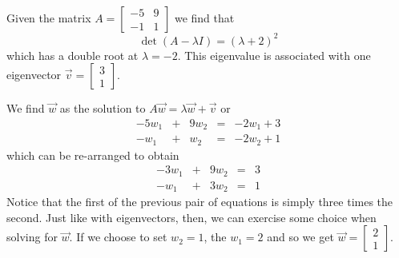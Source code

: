 \documentclass[../book.tex]{subfiles}
\begin{document}
\begin{solution}
Given the matrix \(A = \begin{bmatrix} -5 & 9 \\ -1 & 1\end{bmatrix}\) we find that
\begin{equation}\label{eq:sys-38}
\det (A - \lambda I) = (\lambda + 2)^2
\end{equation}
which has a double root at \(\lambda = -2\). This eigenvalue is associated with one eigenvector \(\vec{v} = \begin{bmatrix} 3 \\ 1 \end{bmatrix}\).

We find \(\vec{w}\) as the solution to \(A \vec{w} = \lambda  \vec{w} + \vec{v}\) or
\begin{equation}\label{eq:sys-39}
\begin{array}{rcrcl}
  - 5  w_1 &+& 9  w_2 &=& -2  w_1 + 3 \\
  - w_1 &+& w_2 &=& -2 w_2 + 1
\end{array}
\end{equation}
which can be re-arranged to obtain
\begin{equation}\label{eq:sys-40}
\begin{array}{rcrcl}
  -3 w_1 &+& 9 w_2 &=& 3 \\
  - w_1 &+& 3 w_2 &=& 1
\end{array}
\end{equation}
Notice that the first of the previous pair of equations is simply three times the second. Just like with eigenvectors, then, we can exercise some choice when solving for \(\vec{w}\). If we choose to set \(w_2=1\), the \(w_1=2\) and so we get \(\vec{w}=\begin{bmatrix} 2 \\ 1 \end{bmatrix}\).


\end{solution}
\end{document}
